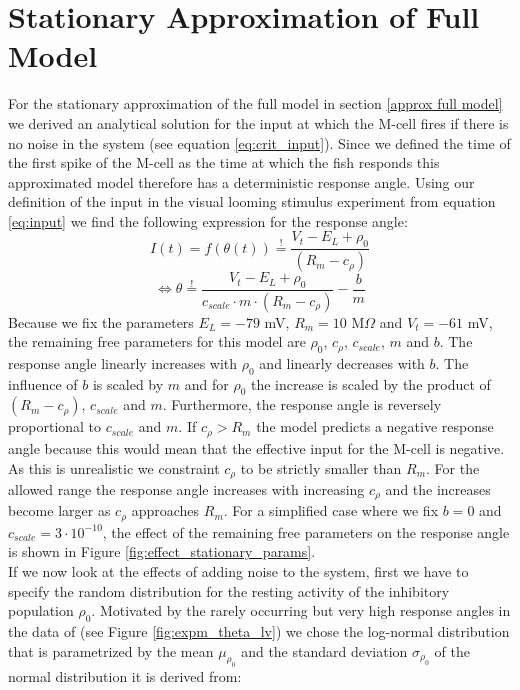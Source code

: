 \documentclass[a4paper,10pt,hidelinks]{scrreprt}
\begin{document}
	\section{Stationary Approximation of Full Model}
    For the stationary approximation of the full model in section \ref{approx full model} we derived an analytical solution for the input at which the M-cell fires if there is no noise in the system (see equation \ref{eq:crit_input}).
    Since we defined the time of the first spike of the M-cell as the time at which the fish responds this approximated model therefore has a deterministic response angle.
    Using our definition of the input in the visual looming stimulus experiment from equation \ref{eq:input} we find the following expression for the response angle:
    \begin{equation}
	I(t) = f(\theta(t)) \overset{!}{=} \frac{V_t - E_{L} + \rho_{0}}{(R_{m} - c_{\rho})}
	\label{eq:crit_theta_start}
	\end{equation}
    \begin{equation}
	\Leftrightarrow \theta \overset{!}{=} \frac{V_t - E_{L} + \rho_{0}}{c_{scale}\cdot m \cdot (R_{m} - c_{\rho})} - \frac{b}{m}
	\label{eq:crit_theta_end}
	\end{equation}
	Because we fix the parameters $E_{L}=-79$ mV, $R_{m}=10$ M$\Omega$ and $V_{t}=-61$ mV, the remaining free parameters for this model are $\rho_{0}$, $c_{\rho}$, $c_{scale}$, $m$ and $b$.
    The response angle linearly increases with $\rho_{0}$ and linearly decreases with $b$.
    The influence of $b$ is scaled by $m$ and for $\rho_{0}$ the increase is scaled by the product of $(R_{m} - c_{\rho})$, $c_{scale}$ and $m$.
    Furthermore, the response angle is reversely proportional to $c_{scale}$ and $m$.
    If $c_{\rho} > R_{m}$ the model predicts a negative response angle because this would mean that the effective input for the M-cell is negative.
    As this is unrealistic we constraint $c_{\rho}$ to be strictly smaller than $R_{m}$.
    For the allowed range the response angle increases with increasing $c_{\rho}$ and the increases become larger as $c_{\rho}$ approaches $R_{m}$.
    For a simplified case where we fix $b=0$ and $c_{scale}=3\cdot10^{-10}$, the effect of the remaining free parameters on the response angle is shown in Figure \ref{fig:effect_stationary_params}.\\
    If we now look at the effects of adding noise to the system, first we have to specify the random distribution for the resting activity of the inhibitory population $\rho_0$.
    Motivated by the rarely occurring but very high response angles in the data of \cite{Bhattacharyya2017} (see Figure \ref{fig:expm_theta_lv}) we chose the log-normal distribution that is parametrized by the mean $\mu_{\rho_{0}}$ and the standard deviation $\sigma_{\rho_{0}}$ of the normal distribution it is derived from:
\end{document}

